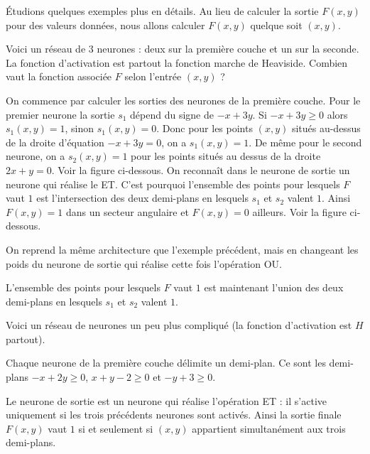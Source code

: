 \documentclass[11pt,class=report,crop=false]{standalone}
\begin{document}
\'Etudions quelques exemples plus en détails. Au lieu de calculer la sortie $F(x,y)$ pour des valeurs données, nous allons calculer $F(x,y)$ quelque soit $(x,y)$.

\vspace*{-1ex}

\begin{exemple}
Voici un réseau de $3$ neurones : deux sur la première couche et un sur la seconde. La fonction d'activation est partout la fonction marche de Heaviside.
Combien vaut la fonction associée $F$ selon l'entrée $(x,y)$ ?



On commence par calculer les sorties des neurones de la première couche.
Pour le premier neurone la sortie $s_1$ dépend du signe de $-x+3y$.
Si $-x+3y \ge 0$ alors $s_1(x,y)=1$, sinon $s_1(x,y)=0$. Donc pour les points $(x,y)$ situés au-dessus de la droite d'équation $-x+3y=0$, on a $s_1(x,y)=1$.
De même pour le second neurone, on a $s_2(x,y)=1$ pour les points situés au dessus de la droite $2x+y=0$. Voir la figure ci-dessous.
On reconnaît dans le neurone de sortie un neurone qui réalise le \og{}ET\fg{}. 
C'est pourquoi l'ensemble des points pour lesquels $F$ vaut $1$ est l'intersection des deux demi-plans en lesquels $s_1$ et $s_2$ valent $1$. Ainsi $F(x,y)=1$ dans un secteur angulaire et $F(x,y)=0$ ailleurs. Voir la figure ci-dessous.


\end{exemple}

\medskip

\begin{exemple}
On reprend la même architecture que l'exemple précédent, mais en changeant les poids du neurone de sortie qui réalise cette fois l'opération \og{}OU\fg{}.


L'ensemble des points pour lesquels $F$ vaut $1$ est maintenant l'union des deux demi-plans en lesquels $s_1$ et $s_2$ valent $1$.

\end{exemple}

\begin{exemple}
Voici un réseau de neurones un peu plus compliqué (la fonction d'activation est $H$ partout). 

Chaque neurone de la première couche délimite un demi-plan. Ce sont les demi-plans $-x+2y\ge0$, $x+y-2\ge0$ et $-y+3\ge0$.

Le neurone de sortie est un neurone qui réalise l'opération \og{}ET\fg{} : il s'active uniquement si les trois précédents neurones sont activés.
Ainsi la sortie finale $F(x,y)$ vaut $1$ si et seulement si $(x,y)$ appartient simultanément aux trois demi-plans.


\end{exemple}
\end{document}
